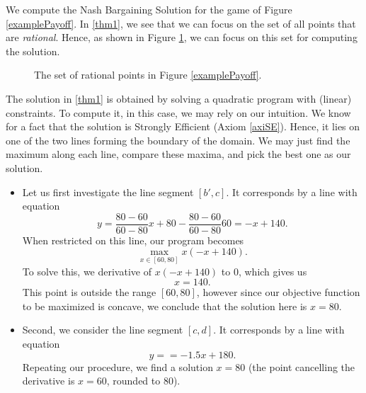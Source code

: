 \begin{example}
We compute the Nash Bargaining Solution for the game of Figure \ref{examplePayoff}.
In \eqref{thm1}, we see that we can focus on the set of all points that are \emph{rational}. Hence, as shown in Figure \ref{example2Payoff}, we can focus on this set for computing the solution.

\begin{figure}[!ht]
\centering
{}
\caption{The set of rational points in Figure \ref{examplePayoff}.}
\label{example2Payoff}
\end{figure}

The solution in \eqref{thm1} is obtained by solving a quadratic program with (linear) constraints.
To compute it,  in this case, we may rely on our intuition.
We know for a fact that the solution is Strongly Efficient (Axiom \ref{axiSE}). Hence, it lies on one of the two lines forming the boundary of the domain.
We may just find the maximum along each line, compare these maxima, and pick the best one as our solution.

\begin{itemize}
\item Let us first investigate the line segment $[b',c]$. It corresponds by a line with equation
$$ y = \frac{80 - 60}{60 - 80} x + 80 - \frac{80 - 60}{60 - 80} 60 = - x + 140. $$
When restricted on this line, our program becomes
$$ \max_{x \in [60,80]} x (- x + 140). $$
To solve this, we derivative of $x (- x + 140)$ to $0$, which gives us
$$  x = 140. $$
This point is outside the range $[60,80]$, however since our objective function to be maximized is concave, we conclude that the solution here is $x = 80$.
\item Second, we consider the line segment $[c,d]$. It corresponds by a line with equation
$$ y =  = -1.5 x + 180. $$
Repeating our procedure, we find a solution $x = 80$ (the point cancelling the derivative is $x = 60$, rounded to 80).


\end{itemize}
\end{example}
